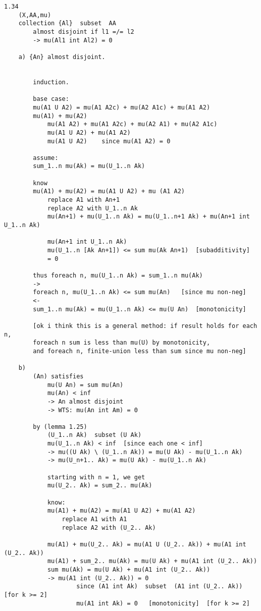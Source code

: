 \documentclass{article}
\begin{document}
\begin{flushleft}
\begin{verbatim}
1.34 
    (X,AA,mu)
    collection {Al}  subset  AA 
        almost disjoint if l1 =/= l2 
        -> mu(Al1 int Al2) = 0
        
    a) {An} almost disjoint. 


        induction.

        base case:
        mu(A1 U A2) = mu(A1 A2c) + mu(A2 A1c) + mu(A1 A2)
        mu(A1) + mu(A2)
            mu(A1 A2) + mu(A1 A2c) + mu(A2 A1) + mu(A2 A1c)
            mu(A1 U A2) + mu(A1 A2)
            mu(A1 U A2)    since mu(A1 A2) = 0

        assume:
        sum_1..n mu(Ak) = mu(U_1..n Ak) 

        know 
        mu(A1) + mu(A2) = mu(A1 U A2) + mu (A1 A2)
            replace A1 with An+1
            replace A2 with U_1..n Ak 
            mu(An+1) + mu(U_1..n Ak) = mu(U_1..n+1 Ak) + mu(An+1 int U_1..n Ak)

            mu(An+1 int U_1..n Ak)
            mu(U_1..n [Ak An+1]) <= sum mu(Ak An+1)  [subadditivity]
            = 0

        thus foreach n, mu(U_1..n Ak) = sum_1..n mu(Ak)
        ->
        foreach n, mu(U_1..n Ak) <= sum mu(An)   [since mu non-neg]
        <-
        sum_1..n mu(Ak) = mu(U_1..n Ak) <= mu(U An)  [monotonicity]

        [ok i think this is a general method: if result holds for each n, 
        foreach n sum is less than mu(U) by monotonicity,
        and foreach n, finite-union less than sum since mu non-neg]

    b)
        (An) satisfies 
            mu(U An) = sum mu(An)
            mu(An) < inf
            -> An almost disjoint 
            -> WTS: mu(An int Am) = 0

        by (lemma 1.25)
            (U_1..n Ak)  subset (U Ak)
            mu(U_1..n Ak) < inf  [since each one < inf] 
            -> mu((U Ak) \ (U_1..n Ak)) = mu(U Ak) - mu(U_1..n Ak)
            -> mu(U_n+1.. Ak) = mu(U Ak) - mu(U_1..n Ak)

            starting with n = 1, we get 
            mu(U_2.. Ak) = sum_2.. mu(Ak)

            know:
            mu(A1) + mu(A2) = mu(A1 U A2) + mu(A1 A2)
                replace A1 with A1 
                replace A2 with (U_2.. Ak)

            mu(A1) + mu(U_2.. Ak) = mu(A1 U (U_2.. Ak)) + mu(A1 int (U_2.. Ak))
            mu(A1) + sum_2.. mu(Ak) = mu(U Ak) + mu(A1 int (U_2.. Ak))
            sum mu(Ak) = mu(U Ak) + mu(A1 int (U_2.. Ak))
            -> mu(A1 int (U_2.. Ak)) = 0 
                    since (A1 int Ak)  subset  (A1 int (U_2.. Ak))  [for k >= 2]
                    mu(A1 int Ak) = 0   [monotonicity]  [for k >= 2]


\end{verbatim}
\end{flushleft}
\end{document}
